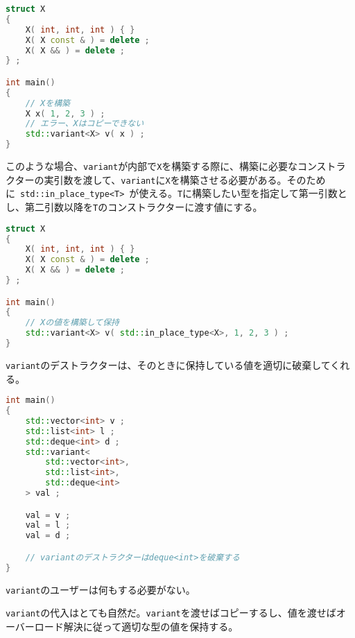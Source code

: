 \begin{lstlisting}[language=C++]
struct X
{
    X( int, int, int ) { }
    X( X const & ) = delete ;
    X( X && ) = delete ; 
} ;

int main()
{
    // Xを構築
    X x( 1, 2, 3 ) ;
    // エラー、Xはコピーできない
    std::variant<X> v( x ) ;
}
\end{lstlisting}

このような場合、\lstinline!variant!が内部で\lstinline!X!を構築する際に、構築に必要なコンストラクターの実引数を渡して、\lstinline!variant!に\lstinline!X!を構築させる必要がある。そのために~\lstinline!std::in_place_type<T>!~が使える。\lstinline!T!に構築したい型を指定して第一引数とし、第二引数以降を\lstinline!T!のコンストラクターに渡す値にする。

\begin{lstlisting}[language=C++]
struct X
{
    X( int, int, int ) { }
    X( X const & ) = delete ;
    X( X && ) = delete ; 
} ;

int main()
{
    // Xの値を構築して保持
    std::variant<X> v( std::in_place_type<X>, 1, 2, 3 ) ;
}
\end{lstlisting}

%

\lstinline!variant!のデストラクターは、そのときに保持している値を適切に破棄してくれる。

\begin{lstlisting}[language=C++]
int main()
{
    std::vector<int> v ;
    std::list<int> l ;
    std::deque<int> d ;
    std::variant< 
        std::vector<int>, 
        std::list<int>,
        std::deque<int>
    > val ;

    val = v ;
    val = l ;
    val = d ;

    // variantのデストラクターはdeque<int>を破棄する
}
\end{lstlisting}

\lstinline!variant!のユーザーは何もする必要がない。

%

\lstinline!variant!の代入はとても自然だ。\lstinline!variant!を渡せばコピーするし、値を渡せばオーバーロード解決に従って適切な型の値を保持する。

%

